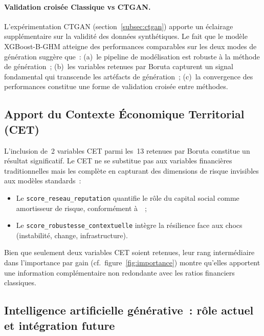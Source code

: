 \documentclass[12pt, a4paper, twocolumn]{article}
\begin{document}
\paragraph{Validation croisée Classique vs CTGAN.}
L'expérimentation CTGAN (section~\ref{subsec:ctgan}) apporte un éclairage supplémentaire sur la validité des données synthétiques. Le fait que le modèle XGBoost-B-GHM atteigne des performances comparables sur les deux modes de génération suggère que~: (a)~le pipeline de modélisation est robuste à la méthode de génération~; (b)~les variables retenues par Boruta capturent un signal fondamental qui transcende les artéfacts de génération~; (c)~la convergence des performances constitue une forme de validation croisée entre méthodes.

\subsection{Apport du Contexte Économique Territorial (CET)}
\label{subsec:discuss_cet}

L'inclusion de~2 variables CET parmi les~13 retenues par Boruta constitue un résultat significatif. Le CET ne se substitue pas aux variables financières traditionnelles mais les complète en capturant des dimensions de risque invisibles aux modèles standards~:

\begin{itemize}[leftmargin=*]
  \item Le \texttt{score\_reseau\_reputation} quantifie le rôle du capital social comme amortisseur de risque, conformément à~\cite{guerin2015}~;
  \item Le \texttt{score\_robustesse\_contextuelle} intègre la résilience face aux chocs (instabilité, change, infrastructure).
\end{itemize}

Bien que seulement deux variables CET soient retenues, leur rang intermédiaire dans l'importance par gain (cf.\ figure~\ref{fig:importance}) montre qu'elles apportent une information complémentaire non redondante avec les ratios financiers classiques.

\subsection{Intelligence artificielle générative~: rôle actuel et intégration future}
\label{subsec:discuss_ia}
\end{document}
